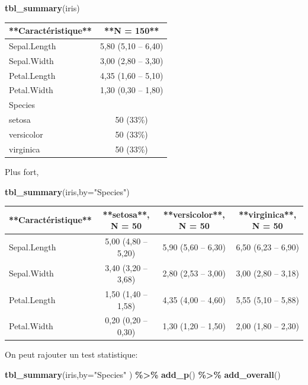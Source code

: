 \documentclass[
]{book}
\newenvironment{Shaded}{\begin{snugshade}}{\end{snugshade}}
\newcommand{\AttributeTok}[1]{\textcolor[rgb]{0.13,0.29,0.53}{#1}}
\newcommand{\FunctionTok}[1]{\textcolor[rgb]{0.13,0.29,0.53}{\textbf{#1}}}
\newcommand{\NormalTok}[1]{#1}
\newcommand{\SpecialCharTok}[1]{\textcolor[rgb]{0.81,0.36,0.00}{\textbf{#1}}}
\newcommand{\StringTok}[1]{\textcolor[rgb]{0.31,0.60,0.02}{#1}}
\begin{document}
\begin{Shaded}
\begin{Highlighting}[]
\FunctionTok{tbl\_summary}\NormalTok{(iris)}
\end{Highlighting}
\end{Shaded}

\begin{tabular}{l|c}
\hline
**Caractéristique** & **N = 150**\\
\hline
Sepal.Length & 5,80 (5,10 – 6,40)\\
\hline
Sepal.Width & 3,00 (2,80 – 3,30)\\
\hline
Petal.Length & 4,35 (1,60 – 5,10)\\
\hline
Petal.Width & 1,30 (0,30 – 1,80)\\
\hline
Species & \\
\hline
setosa & 50 (33\%)\\
\hline
versicolor & 50 (33\%)\\
\hline
virginica & 50 (33\%)\\
\hline
\end{tabular}

Plus fort,

\begin{Shaded}
\begin{Highlighting}[]
\FunctionTok{tbl\_summary}\NormalTok{(iris,}\AttributeTok{by=}\StringTok{"Species"}\NormalTok{)}
\end{Highlighting}
\end{Shaded}

\begin{tabular}{l|c|c|c}
\hline
**Caractéristique** & **setosa**, N = 50 & **versicolor**, N = 50 & **virginica**, N = 50\\
\hline
Sepal.Length & 5,00 (4,80 – 5,20) & 5,90 (5,60 – 6,30) & 6,50 (6,23 – 6,90)\\
\hline
Sepal.Width & 3,40 (3,20 – 3,68) & 2,80 (2,53 – 3,00) & 3,00 (2,80 – 3,18)\\
\hline
Petal.Length & 1,50 (1,40 – 1,58) & 4,35 (4,00 – 4,60) & 5,55 (5,10 – 5,88)\\
\hline
Petal.Width & 0,20 (0,20 – 0,30) & 1,30 (1,20 – 1,50) & 2,00 (1,80 – 2,30)\\
\hline
\end{tabular}

On peut rajouter un test statistique:

\begin{Shaded}
\begin{Highlighting}[]
\FunctionTok{tbl\_summary}\NormalTok{(iris,}\AttributeTok{by=}\StringTok{"Species"}\NormalTok{ ) }\SpecialCharTok{\%\textgreater{}\%} \FunctionTok{add\_p}\NormalTok{() }\SpecialCharTok{\%\textgreater{}\%} \FunctionTok{add\_overall}\NormalTok{()}
\end{Highlighting}
\end{Shaded}
\end{document}
